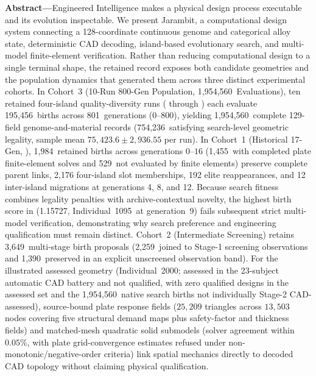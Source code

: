 \documentclass[10pt,journal,letterpaper]{IEEEtran}
\providecommand{\CohortOneBirths}{1,984}
\providecommand{\CohortOneFemComplete}{1,455}
\providecommand{\CohortOneFemNotEvaluated}{529}
\providecommand{\CohortOneBestFit}{1.15727}
\providecommand{\CohortOneBestId}{1095}
\providecommand{\CohortOneBestGen}{9}
\providecommand{\CohortTwoBirthEvents}{3,649}
\providecommand{\CohortTwoScreenRows}{2,259}
\providecommand{\CohortTwoUnscreenedBirths}{1,390}
\providecommand{\CohortThreeGenerations}{801}
\providecommand{\CohortThreeRowsPerRun}{195,456}
\providecommand{\CohortThreeTotalEvaluations}{1,954,560}
\providecommand{\CohortThreeLegalEvaluations}{754,236}
\begin{document}
\noindent\textbf{Abstract---}Engineered Intelligence makes a physical design process executable and its evolution inspectable. We present Jarambit, a computational design system connecting a 128-coordinate continuous genome and categorical alloy state, deterministic CAD decoding, island-based evolutionary search, and multi-model finite-element verification. Rather than reducing computational design to a single terminal shape, the retained record exposes both candidate geometries and the population dynamics that generated them across three distinct experimental cohorts. In Cohort~3 (10-Run 800-Gen Population, \CohortThreeTotalEvaluations\ Evaluations), ten retained four-island quality-diversity runs ( through ) each evaluate \CohortThreeRowsPerRun\ births across \CohortThreeGenerations\ generations ($0$--$800$), yielding \CohortThreeTotalEvaluations\ complete 129-field genome-and-material records (\CohortThreeLegalEvaluations\ satisfying search-level geometric legality, sample mean $75{,}423.6 \pm 2{,}936.55$ per run). In Cohort~1 (Historical 17-Gen, ), \CohortOneBirths\ retained births across generations $0$--$16$ (\CohortOneFemComplete\ with completed plate finite-element solves and \CohortOneFemNotEvaluated\ not evaluated by finite elements) preserve complete parent links, 2,176 four-island slot memberships, 192 elite reappearances, and 12 inter-island migrations at generations 4, 8, and 12. Because search fitness combines legality penalties with archive-contextual novelty, the highest birth score in  (\CohortOneBestFit, Individual~\CohortOneBestId\ at generation~\CohortOneBestGen) fails subsequent strict multi-model verification, demonstrating why search preference and engineering qualification must remain distinct. Cohort~2 (Intermediate Screening) retains \CohortTwoBirthEvents\ multi-stage birth proposals (\CohortTwoScreenRows\ joined to Stage-1 screening observations and \CohortTwoUnscreenedBirths\ preserved in an explicit unscreened observation band). For the illustrated assessed geometry (Individual~2000; assessed in the 23-subject automatic CAD battery and not qualified, with zero qualified designs in the assessed set and the \CohortThreeTotalEvaluations\ native search births not individually Stage-2 CAD-assessed), source-bound plate response fields ($25{,}209$ triangles across $13{,}503$ nodes covering five structural demand maps plus safety-factor and thickness fields) and matched-mesh quadratic solid submodels (solver agreement within $0.05\%$, with plate grid-convergence estimates refused under non-monotonic/negative-order criteria) link spatial mechanics directly to decoded CAD topology without claiming physical qualification.
\end{document}
